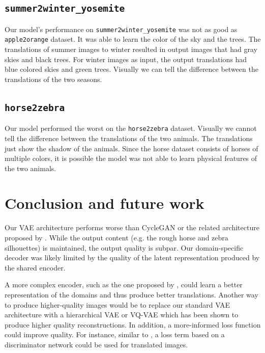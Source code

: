 \documentclass{article}
\begin{document}
\subsection{\texttt{summer2winter\_yosemite}}
Our model’s performance on \texttt{summer2winter\_yosemite} was not as good as \texttt{apple2orange} dataset. It was able to learn the color of the sky and the trees. The translations of summer images to winter resulted in output images that had gray skies and black trees. For winter images as input, the output translations had blue colored skies and green trees. Visually we can tell the difference between the translations of the two seasons.

\subsection{\texttt{horse2zebra}}
Our model performed the worst on the \texttt{horse2zebra} dataset. Visually we cannot tell the difference between the translations of the two animals. The translations just show the shadow of the animals. Since the horse dataset consists of horses of multiple colors, it is possible the model was not able to learn physical features of the two animals.




\section{Conclusion and future work}
Our VAE architecture performs worse than CycleGAN or the related architecture proposed by \citet{liu}. While the output content (e.g. the rough horse and zebra silhouettes) is maintained, the output quality is subpar. Our domain-specific decoder was likely limited by the quality of the latent representation produced by the shared encoder.

A more complex encoder, such as the one proposed by \citet{liu}, could learn a better representation of the domains and thus produce better translations. Another way to produce higher-quality images would be to replace our standard VAE architecture with a hierarchical VAE or VQ-VAE which has been shown to produce higher quality reconstructions. In addition, a more-informed loss function could improve quality. For instance, similar to \citet{liu}, a loss term based on a discriminator network could be used for translated images.
\end{document}
